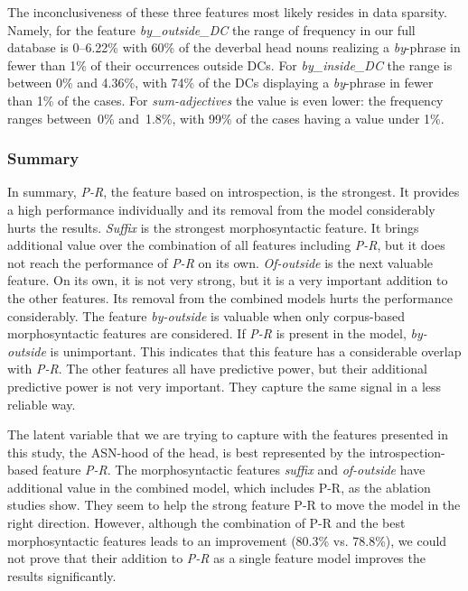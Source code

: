 \documentclass[output=paper]{langsci/langscibook}
\begin{document}
The inconclusiveness of these three features most likely resides in data sparsity. Namely, for the feature {\textit{by\_outside\_DC}} the range of frequency in our full database is 0--6.22\% with 60\% of the deverbal head nouns realizing a \textit{by}-phrase in fewer than 1\% of their occurrences outside DCs. For \textit{by\_inside\_DC} the range is between 0\% and 4.36\%, with 74\% of the DCs displaying a \textit{by}-phrase  in fewer than 1\% of the cases. For \textit{sum-adjectives} the value is even lower: the frequency ranges between~0\% and~1.8\%, with 99\% of the cases having a value under 1\%. 

\subsubsection{Summary}
In summary, \textit{P-R}, the feature based on introspection, is the strongest. It provides a high performance individually and its removal from the model considerably hurts the results. \textit{Suffix} is the strongest morphosyntactic feature. It brings additional value over the combination of all features including  \textit{P-R}, but it does not reach the performance of \textit{P-R} on its own. \textit{Of-outside} is the next valuable feature. On its own, it is not very strong, but it is a very important addition to the other features. Its removal from the combined models hurts the performance considerably. The feature \textit{by-outside} is valuable when only corpus-based morphosyntactic features are considered. If \textit{P-R }is present in the model, \textit{by-outside} is unimportant. This indicates that this feature has a considerable overlap with \textit{P-R}. The other features all have predictive power, but their additional predictive power is not very important. They capture the same signal in a less reliable way.

The latent variable that we are trying to capture with the features presented in this study, the ASN-hood of the head, is best represented by the introspection-based feature \textit{P-R}. The morphosyntactic features \textit{suffix} and \textit{of-outside} have additional value in the combined model, which includes P-R, as the ablation studies show. They seem to help the strong feature P-R to move the model in the right direction. However, although the combination of P-R and the best morphosyntactic features leads to an improvement (80.3\% vs. 78.8\%), we could not prove that their addition to \textit{P-R} as a single feature model improves the results significantly.
\end{document}
